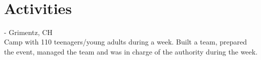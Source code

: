 \documentclass[mm, 11pt]{simple_style}
\begin{document}
\begin{resume}
\begin{project}
\end{project}\\
\sectionline

\section{Activities}
 - Grimentz, CH \\
Camp with 110 teenagers/young adults during a week. Built a team, prepared the event, managed the team and was in charge of the authority during the week.\\
\end{resume}
\end{document}

